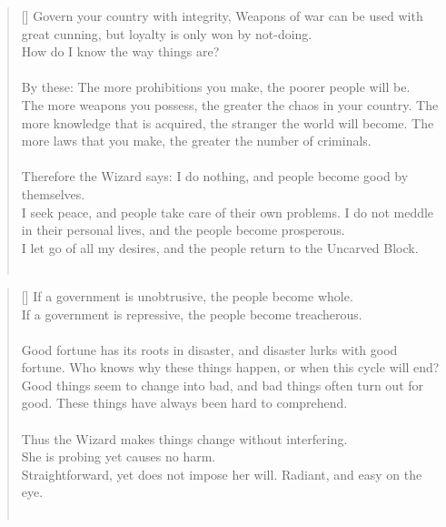 \documentclass{article}
\begin{document}
\settowidth{\versewidth}{The Wizard leads byemptying people’s minds, filling their bellies, weakening their am- bitions, and making them become strong}
\begin{verse}[\versewidth]
Govern your country with integrity, Weapons of war can be used with great cunning, but loyalty is only won by not-doing.\\
How do I know the way things are?\\
\hfill\\
By these:
The more prohibitions you make, the poorer people will be.\\
The more weapons you possess, the greater the chaos in your country. 
The more knowledge that is acquired, the stranger the world will become. 
The more laws that you make, the greater the number of criminals.\\
\hfill\\
Therefore the Wizard says:
I do nothing, and people become good by themselves.\\
I seek peace, and people take care of their own problems. 
I do not meddle in their personal lives, and the people become prosperous.\\
I let go of all my desires, and the people return to the Uncarved Block.\\
\hfill\\
\end{verse}

\settowidth{\versewidth}{The Wizard leads byemptying people’s minds, filling their bellies, weakening their am- bitions, and making them become strong}
\begin{verse}[\versewidth]
If a government is unobtrusive, the people become whole.\\
If a government is repressive, the people become treacherous.\\
\hfill\\
Good fortune has its roots in disaster, and disaster lurks with good fortune. 
Who knows why these things happen, or when this cycle will end?\\
Good things seem to change into bad, and bad things often turn out for good. 
These things have always been hard to comprehend.\\
\hfill\\
Thus the Wizard makes things change without interfering.\\
She is probing yet causes no harm.\\
Straightforward, yet does not impose her will. 
Radiant, and easy on the eye.\\
\hfill\\
\end{verse}
\end{document}
